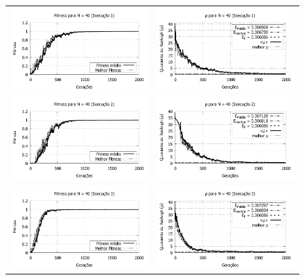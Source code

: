 		\begin{figure}[p]
	\centering
  \begin{tabular}{@{}cc@{}}
		\includegraphics[width=.40\textwidth]{figs/resultados/fitnessEL/N-40_E-1_fitness-extendido.pdf} &
    \includegraphics[width=.40\textwidth]{figs/resultados/fitnessEL/N-40_E-1_rho_extendido.pdf}   \\
		\includegraphics[width=.40\textwidth]{figs/resultados/fitnessEL/N-40_E-2_fitness-extendido.pdf} &
    \includegraphics[width=.40\textwidth]{figs/resultados/fitnessEL/N-40_E-2_rho_extendido.pdf}   \\
		\includegraphics[width=.40\textwidth]{figs/resultados/fitnessEL/N-40_E-3_fitness-extendido.pdf} &
    \includegraphics[width=.40\textwidth]{figs/resultados/fitnessEL/N-40_E-3_rho_extendido.pdf}   \\

\end{tabular}
\end{figure}
